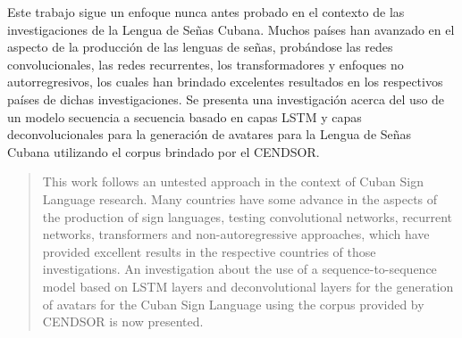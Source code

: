 \begin{resumen}

	Este trabajo sigue un enfoque nunca antes probado en el contexto de las investigaciones de la Lengua de Señas Cubana. Muchos países han avanzado en el aspecto de la producción de las lenguas de señas, probándose las redes convolucionales, las redes recurrentes, los transformadores y enfoques no autorregresivos, los cuales han brindado excelentes resultados en los respectivos países de dichas investigaciones. Se presenta una investigación acerca del uso de un modelo secuencia a secuencia basado en capas LSTM y capas deconvolucionales para la generación de avatares para la Lengua de Señas Cubana utilizando el corpus brindado por el CENDSOR.
	
\end{resumen}

\begin{abstract}

	This work follows an untested approach in the context of Cuban Sign Language research. Many countries have some advance in the aspects of the production of sign languages, testing convolutional networks, recurrent networks, transformers and non-autoregressive approaches, which have provided excellent results in the respective countries of those investigations. An investigation about the use of a sequence-to-sequence model based on LSTM layers and deconvolutional layers for the generation of avatars for the Cuban Sign Language using the corpus provided by CENDSOR is now presented.
	
\end{abstract}